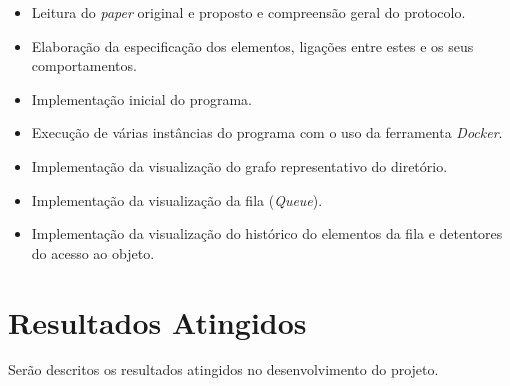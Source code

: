 \begin{itemize}
    \item Leitura do \emph{paper} original e proposto e compreensão geral do protocolo.
    \item Elaboração da especificação dos elementos, ligações entre estes e os seus comportamentos.
    \item Implementação inicial do programa.
    \item Execução de várias instâncias do programa com o uso da ferramenta \emph{Docker}.
    \item Implementação da visualização do grafo representativo do diretório.
    \item Implementação da visualização da fila (\emph{Queue}).
    \item Implementação da visualização do histórico do elementos da fila e detentores do acesso ao objeto.

\end{itemize}

\section{Resultados Atingidos}
\label{introducao:sec:resultados}
Serão descritos os resultados atingidos no desenvolvimento do projeto.

